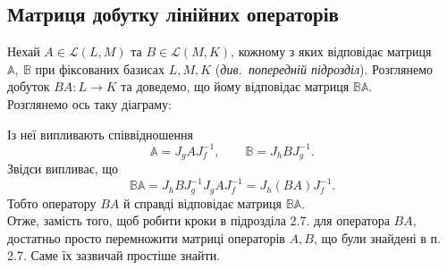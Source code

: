 \documentclass{math_library}
\begin{document}
	\subsection{Матриця добутку лінійних операторів}
	Нехай $A \in \mathcal{L}(L,M)$ та $B \in \mathcal{L}(M,K)$, кожному з яких відповідає матриця $\mathbb{A},\ \mathbb{B}$ при фіксованих базисах $L,M,K$ (\textit{див.\ попередній підрозділ}). Розглянемо добуток $BA \colon L \to K$ та доведемо, що йому відповідає матриця $\mathbb{B}\mathbb{A}$.\\
	Розглянемо ось таку діаграму:
	\begin{center}
\end{center}
Із неї випливають співвідношення
\[
\mathbb{A} = J_g A J_f^{-1}, \qquad \mathbb{B} = J_h B J_g^{-1}.
\] 
Звідси випливає, що
\[
\mathbb{B} \mathbb{A} = J_h B J_g^{-1} J_g A J_f^{-1} = J_h (BA) J_f^{-1}.
\]
Тобто оператору $BA$ й справді відповідає матриця $\mathbb{B} \mathbb{A}$.
\bigskip \\
Отже, замість того, щоб робити кроки в підрозділа 2.7. для оператора $BA$, достатньо просто перемножити матриці операторів $A,B$, що були знайдені в п. 2.7. Саме їх зазвичай простіше знайти.
\end{document}
